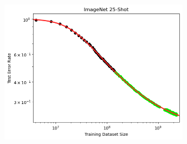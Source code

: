 \documentclass{article} %
\begin{document}
\vspace{-3.9mm}


\begin{figure}[h]
    \centering

\includegraphics[width=0.71\textwidth]{figures/order_of_magnitude__data_x-axis/imagenet_25___MiX_L_16.png}


\end{figure}
\end{document}
